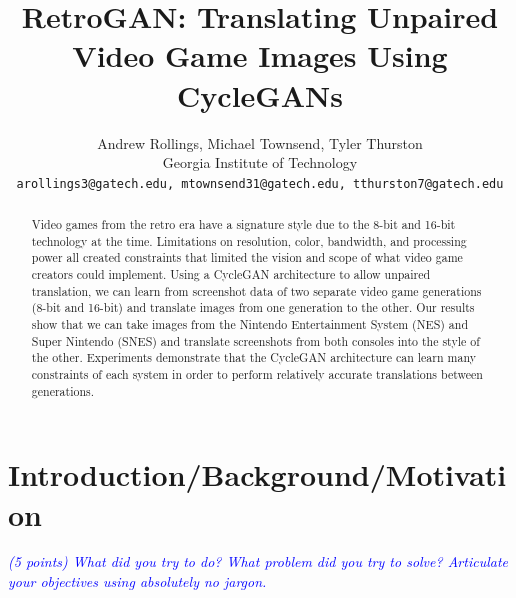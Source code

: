 \documentclass[10pt,twocolumn,letterpaper]{article}
\begin{document}
\title{RetroGAN: Translating Unpaired Video Game Images Using CycleGANs}

\author{Andrew Rollings, Michael Townsend, Tyler Thurston\\
Georgia Institute of Technology\\
{\tt\small arollings3@gatech.edu, mtownsend31@gatech.edu, tthurston7@gatech.edu}
}

\maketitle

\begin{abstract}
   Video games from the retro era have a signature style due to the 8-bit and 16-bit technology at the time. Limitations on resolution, color, bandwidth, and processing power all created constraints that limited the vision and scope of what video game creators could implement. Using a CycleGAN architecture to allow unpaired translation, we can learn from screenshot data of two separate video game generations (8-bit and 16-bit) and translate images from one generation to the other. Our results show that we can take images from the Nintendo Entertainment System (NES) and Super Nintendo (SNES) and translate screenshots from both consoles into the style of the other. Experiments demonstrate that the CycleGAN architecture can learn many constraints of each system in order to perform relatively accurate translations between generations.
\end{abstract}

\section{Introduction/Background/Motivation}
\textit{\textcolor{blue}{(5 points) What did you try to do? What problem did you try to solve? Articulate your objectives using absolutely no jargon.}}
\end{document}
